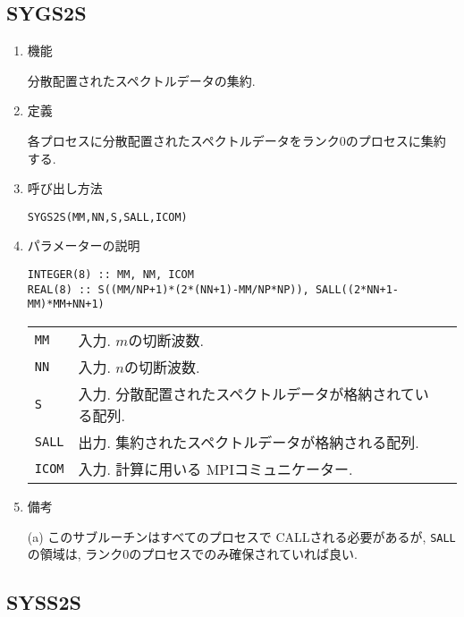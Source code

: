 \documentclass[a4j]{jsarticle}
\begin{document}
\subsection{SYGS2S}

\begin{enumerate}

\item 機能 

分散配置されたスペクトルデータの集約.

\item 定義

各プロセスに分散配置されたスペクトルデータをランク0のプロセスに集約する.

\item 呼び出し方法 

\texttt{SYGS2S(MM,NN,S,SALL,ICOM)}
  
\item パラメーターの説明

\begin{verbatim}        
INTEGER(8) :: MM, NM, ICOM
REAL(8) :: S((MM/NP+1)*(2*(NN+1)-MM/NP*NP)), SALL((2*NN+1-MM)*MM+NN+1)
\end{verbatim}      

\begin{tabular}{lll}
\texttt{MM} & 入力. $m$の切断波数.\\
\texttt{NN} & 入力. $n$の切断波数.\\
\texttt{S} & 入力. 分散配置されたスペクトルデータが格納されている配列.\\
\texttt{SALL} & 出力. 集約されたスペクトルデータが格納される配列.\\
\texttt{ICOM} & 入力. 計算に用いる MPIコミュニケーター.
\end{tabular}

\item 備考

(a) このサブルーチンはすべてのプロセスで CALLされる必要があるが,
\texttt{SALL}の領域は, ランク0のプロセスでのみ確保されていれば良い.

\end{enumerate}



\subsection{SYSS2S}
\end{document}
